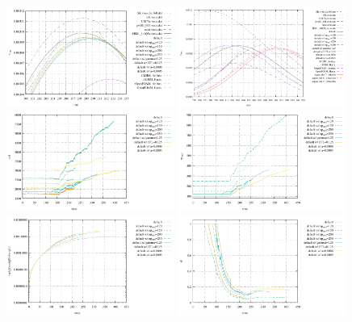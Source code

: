 \begin{center}
\includegraphics[width=5.5cm]{python_codes/fieldstone_95/results/vrms_peak1}
\includegraphics[width=5.5cm]{python_codes/fieldstone_95/results/vrms_peak2}\\
\includegraphics[width=5.5cm]{python_codes/fieldstone_95/results/nel}
\includegraphics[width=5.5cm]{python_codes/fieldstone_95/results/np_surf}\\
\includegraphics[width=5.5cm]{python_codes/fieldstone_95/results/vol2}
\includegraphics[width=5.5cm]{python_codes/fieldstone_95/results/dt}
\end{center}


